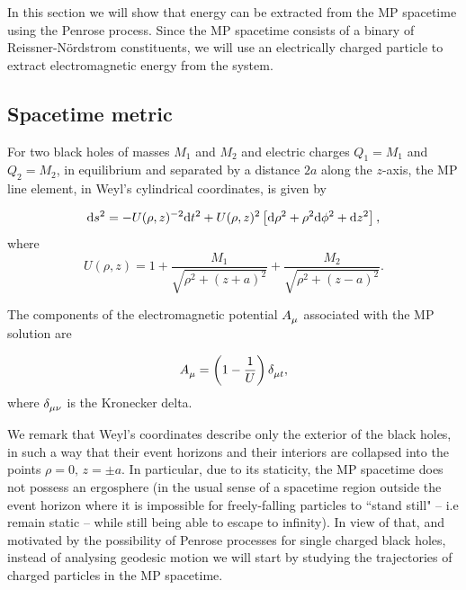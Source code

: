In this section we will show that energy can be extracted from the MP spacetime using the Penrose process. Since the MP spacetime consists of a binary of Reissner-N\"ordstrom constituents, we will use an electrically charged particle to extract electromagnetic energy from the system.

\subsection{Spacetime metric}

For two black holes of masses $M_1$ and $M_2$ and electric charges $Q_1 = M_1$ and $Q_2 = M_2$, in equilibrium and separated by a distance $2a$ along the $z$-axis, the MP line element, in Weyl's cylindrical coordinates, is given by~\cite{SMERAK2016}

\begin{equation}
    \mathrm{d} s^2 = -U(\rho,z)^{-2} \mathrm{d} t^2 + U(\rho,z)^2\left[\mathrm{d}\rho^2 + \rho^2\mathrm{d}\phi^2 + \mathrm{d} z^2\right],
    \label{ch:penrose_binaries/ch:penrose_binaries/eq:majumdar_papapetrou_line_element}
\end{equation}
%
where
\begin{equation}
    U(\rho,z) = 1 + \frac{M_1}{\sqrt{\rho^2 + (z+a)^2}} + \frac{M_2}{\sqrt{\rho^2 + (z-a)^2}}.
    \label{ch:penrose_binaries/eq:mp_metric_potential_cylindric}
\end{equation}

The components of the electromagnetic potential $\tens{A}{}{\mu}$ associated with the MP solution are

\begin{equation}
    \tens{A}{}{\mu} = \left(1 - \frac{1}{U}\right)\tens{\delta}{}{\mu t},
    \label{ch:penrose_binaries/eq:electromagnetic_potential_mp}
\end{equation}
%
where $\tens{\delta}{}{\mu\nu}$ is the Kronecker delta.

We remark that Weyl's coordinates describe only the exterior of the black holes, in such a way that their event horizons and their interiors are collapsed into the points $\rho=0, \, z=\pm a$. In particular, due to its staticity, the MP spacetime does not possess an ergosphere (in the usual sense of a spacetime region outside the event horizon where it is impossible for freely-falling particles to ``stand still" -- i.e remain static -- while still being able to escape to infinity). In view of that, and motivated by the possibility of Penrose processes for single charged black holes, instead of analysing geodesic motion we will start by studying the trajectories of charged particles in the MP spacetime.

